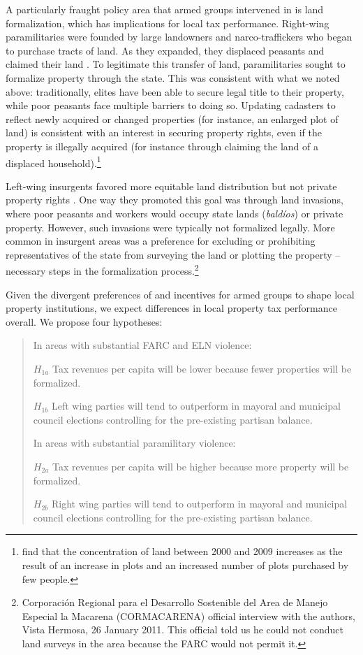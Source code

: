 A particularly fraught policy area that armed groups intervened in is land formalization, which has implications for local tax performance. Right-wing paramilitaries were founded by large landowners and narco-traffickers who began to purchase tracts of land. As they expanded, they displaced peasants and claimed their land \citep{romero00a, ronderos14a, reyes09a}. To legitimate this transfer of land, paramilitaries sought to formalize property through the state. This was consistent with what we noted above: traditionally, elites have been able to secure legal title to their property, while poor peasants face multiple barriers to doing so. Updating cadasters to reflect newly acquired or changed properties (for instance, an enlarged plot of land) is consistent with an interest in securing property rights, even if the property is illegally acquired (for instance through claiming the land of a displaced household).\footnote{\citet{ibanezmunoz11a} find that the concentration of land between 2000 and 2009 increases as the result of an increase in plots and an increased number of plots purchased by few people.} 

Left-wing insurgents favored more equitable land distribution but not private property rights \citep{bernal-morales14a}. One way they promoted this goal was through land invasions, where poor peasants and workers would occupy state lands (\textit{bald\'{i}os}) or private property. However, such invasions were typically not formalized legally. More common in insurgent areas was a preference for excluding or prohibiting representatives of the state from surveying the land or plotting the property -- necessary steps in the formalization process.\footnote{Corporaci\'on Regional para el Desarrollo Sostenible del Area de Manejo Especial la Macarena (CORMACARENA) official interview with the authors, Vista Hermosa, 26 January 2011. This official told us he could not conduct land surveys in the area because the FARC would not permit it.}  

Given the divergent preferences of and incentives for armed groups to shape local property institutions, we expect differences in local property tax performance overall. We propose four hypotheses:

\begin{quotation}
In areas with substantial FARC and ELN violence: 

\noindent $H_{1a}$ Tax revenues per capita will be lower because fewer properties will be formalized.

\noindent $H_{1b}$ Left wing parties will tend to outperform in mayoral and municipal council elections controlling for the pre-existing partisan balance.

\bigskip
In areas with substantial paramilitary violence:

\noindent $H_{2a}$ Tax revenues per capita will be higher because more property will be formalized. 

\noindent $H_{2b}$ Right wing parties will tend to outperform in mayoral and municipal council elections controlling for the pre-existing partisan balance.
\end{quotation}

